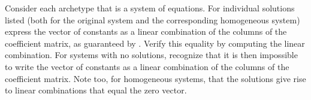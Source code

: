 Consider each archetype that is a system of equations. For individual solutions listed (both for the original system and the corresponding homogeneous system) express the vector of constants as a linear combination of the columns of the coefficient matrix, as guaranteed by .  Verify this equality by computing the linear combination.  For systems with no solutions, recognize that it is then impossible to write the vector of constants as a linear combination of the columns of the coefficient matrix.  Note too, for homogeneous systems, that the solutions give rise to linear combinations that equal the zero vector.\\
\\ 
\\ 
\\ 
\\ 
\\ 
\\ 
\\ 
\\ 
\\

